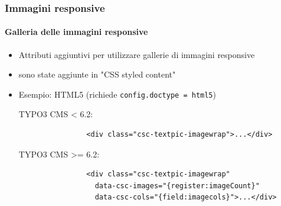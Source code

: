 \begin{frame}[fragile]
	\frametitle{Immagini responsive}
	\framesubtitle{Galleria delle immagini responsive}

	\begin{itemize}
		\item Attributi aggiuntivi per utilizzare gallerie di immagini responsive
		\item sono state aggiunte in "CSS styled content"
		\item Esempio: HTML5 (richiede \texttt{config.doctype = html5})\newline

			TYPO3 CMS < 6.2:


			\begin{lstlisting}
				<div class="csc-textpic-imagewrap">...</div>
			\end{lstlisting}

			TYPO3 CMS >= 6.2:

			\begin{lstlisting}
				<div class="csc-textpic-imagewrap"
				  data-csc-images="{register:imageCount}"
				  data-csc-cols="{field:imagecols}">...</div>
			\end{lstlisting}

	\end{itemize}

\end{frame}


